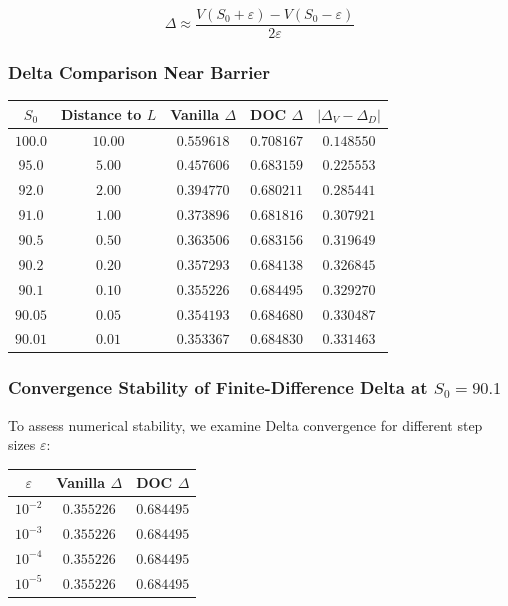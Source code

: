 \documentclass{report}
\begin{document}
$$\Delta \approx \frac{V(S_0 + \varepsilon) - V(S_0 - \varepsilon)}{2\varepsilon}$$

\subsubsection{Delta Comparison Near Barrier}

\begin{center}
\begin{tabular}{ccccc}
\toprule
$S_0$ & Distance to $L$ & Vanilla $\Delta$ & DOC $\Delta$ & $|\Delta_V - \Delta_D|$ \\
\midrule
$100.0$ & $10.00$ & $0.559618$ & $0.708167$ & $0.148550$ \\
$95.0$ & $5.00$ & $0.457606$ & $0.683159$ & $0.225553$ \\
$92.0$ & $2.00$ & $0.394770$ & $0.680211$ & $0.285441$ \\
$91.0$ & $1.00$ & $0.373896$ & $0.681816$ & $0.307921$ \\
$90.5$ & $0.50$ & $0.363506$ & $0.683156$ & $0.319649$ \\
$90.2$ & $0.20$ & $0.357293$ & $0.684138$ & $0.326845$ \\
$90.1$ & $0.10$ & $0.355226$ & $0.684495$ & $0.329270$ \\
$90.05$ & $0.05$ & $0.354193$ & $0.684680$ & $0.330487$ \\
$90.01$ & $0.01$ & $0.353367$ & $0.684830$ & $0.331463$ \\
\bottomrule
\end{tabular}
\end{center}

\subsubsection{Convergence Stability of Finite-Difference Delta at $S_0 = 90.1$}

To assess numerical stability, we examine Delta convergence for different step sizes $\varepsilon$:

\begin{center}
\begin{tabular}{ccc}
\toprule
$\varepsilon$ & Vanilla $\Delta$ & DOC $\Delta$ \\
\midrule
$10^{-2}$ & $0.355226$ & $0.684495$ \\
$10^{-3}$ & $0.355226$ & $0.684495$ \\
$10^{-4}$ & $0.355226$ & $0.684495$ \\
$10^{-5}$ & $0.355226$ & $0.684495$ \\
\bottomrule
\end{tabular}
\end{center}
\end{document}
